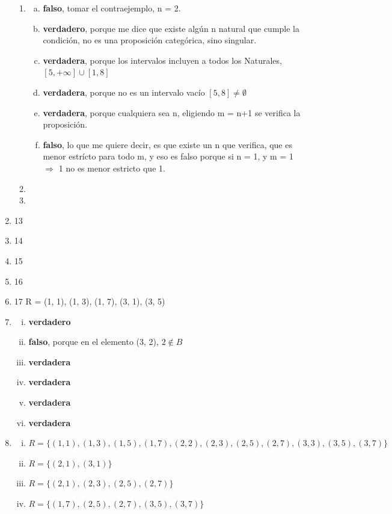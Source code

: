 \documentclass[12pt]{book}
\begin{document}
\begin{enumerate}
\begin{enumerate}[i]
	\item 
\begin{enumerate}[a)]
	\item \textbf{falso}, tomar el contraejemplo, n = 2.
	\item \textbf{verdadero}, porque me dice que existe alg\'un n natural que cumple la condici\'on, no es una proposici\'on categ\'orica, sino singular.
	\item \textbf{verdadera}, porque los intervalos incluyen a todos los Naturales, $[5, + \infty] \cup [1,8]$
	\item \textbf{verdadera}, porque no es un intervalo vac\'io $ [5,8] \neq \emptyset$
	\item \textbf{verdadera}, porque cualquiera sea n, eligiendo m = n+1 se verifica la proposici\'on.
	\item \textbf{falso}, lo que me quiere decir, es que existe un n que verifica, que es menor estr\'icto para todo m, y eso es falso porque si n = 1, y m = 1 $ \Rightarrow $ 1 no es menor estricto que 1.
\end{enumerate}	
	
	\item 
	\item 
	\end{enumerate}
	\item 13				
	\item 14
	\item 15
	\item 16
	\item 17 R = {(1, 1), (1, 3), (1, 7), (3, 1), (3, 5)}
	\item %

\begin{enumerate}[i)]
	\item \textbf{verdadero}
	\item \textbf{falso}, porque en el elemento (3, 2),  $2 \notin B $
	\item \textbf{verdadera}
	\item \textbf{verdadera}
	\item \textbf{verdadera}
	\item \textbf{verdadera}
\end{enumerate}	

	\item %

\begin{enumerate}[i)]
	\item 	$	R = \{ (1, 1), (1, 3), (1, 5), (1, 7),(2,2),(2, 3), (2, 5), (2, 7),(3,3),(3, 5), (3, 7) \} $
	\item $	R = \{ (2, 1), (3,1) \} $
	\item $	R = \{ (2, 1), (2,3), (2,5), (2,7) \} $
	\item $	R = \{ (1, 7), (2, 5),(2,7), (3, 5), (3, 7) \} $
\end{enumerate}	


\end{enumerate}
\end{document}
